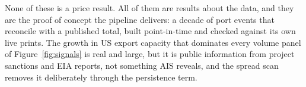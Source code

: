 None of these is a price result. All of them are results about the data, and they
are the proof of concept the pipeline delivers: a decade of port events that
reconcile with a published total, built point-in-time and checked against its own
live prints. The growth in US export capacity that dominates every volume panel of
Figure~\ref{fig:signals} is real and large, but it is public information from
project sanctions and EIA reports, not something AIS reveals, and the spread scan
removes it deliberately through the persistence term.
